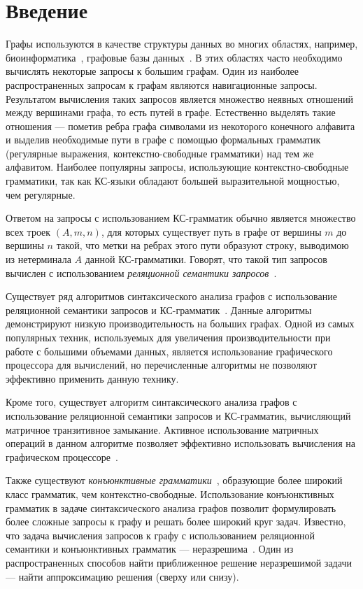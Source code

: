 \documentclass [a4paper] {article}
\begin{document}
	\section{Введение}
	Графы используются в качестве структуры данных во многих областях, например, биоинформатика~\cite{Bio}, графовые базы данных~\cite{graphDB}. В этих областях часто необходимо вычислять некоторые запросы к большим графам. Один из наиболее распространенных запросам к графам являются навигационные запросы. Результатом вычисления таких запросов является множество неявных отношений между вершинами графа, то есть путей в графе. Естественно выделять такие отношения --- пометив ребра графа символами из некоторого конечного алфавита и выделив необходимые пути в графе с помощью формальных грамматик (регулярные выражения, контекстно-свободные грамматики) над тем же алфавитом. Наиболее популярны запросы, использующие контекстно-свободные грамматики, так как КС-языки обладают большей выразительной мощностью, чем регулярные.
	
	Ответом на запросы с использованием КС-грамматик обычно является множество всех троек $(A, m, n)$, для которых существует путь в графе от вершины $m$ до вершины $n$ такой, что метки на ребрах этого пути образуют строку, выводимою из нетерминала $A$ данной КС-грамматики. Говорят, что такой тип запросов вычислен с использованием \textit{реляционной семантики запросов}~\cite{hellingsRelational}. 
	
	Существует ряд алгоритмов синтаксического анализа графов с использование реляционной семантики запросов и КС-грамматик~\cite{hellingsRelational, RDF, GraphQueryWithEarley}. Данные алгоритмы демонстрируют низкую производительность на больших графах. Одной из самых популярных техник, используемых для увеличения производительности при работе с большими объемами данных, является использование графического процессора для вычислений, но перечисленные алгоритмы не позволяют эффективно применить данную технику.
	
	Кроме того, существует алгоритм синтаксического анализа графов с использование реляционной семантики запросов и КС-грамматик, вычисляющий матричное транзитивное замыкание. Активное использование матричных операций в данном алгоритме позволяет эффективно использовать вычисления на графическом процессоре~\cite{matricesOnGPGPU}. 
	
	Также существуют \textit{конъюнктивные грамматики}~\cite{okhotin2001conjunctive}, образующие более широкий класс грамматик, чем контекстно-свободные. Использование конъюнктивных грамматик в задаче синтаксического анализа графов позволит формулировать более сложные запросы к графу и решать более широкий круг задач. Известно, что задача вычисления запросов к графу с использованием реляционной семантики и конъюнктивных грамматик --- неразрешима~\cite{hellingsRelational}. Один из распространенных способов найти приближенное решение неразрешимой задачи --- найти аппроксимацию решения (сверху или снизу).
	
\end{document}
